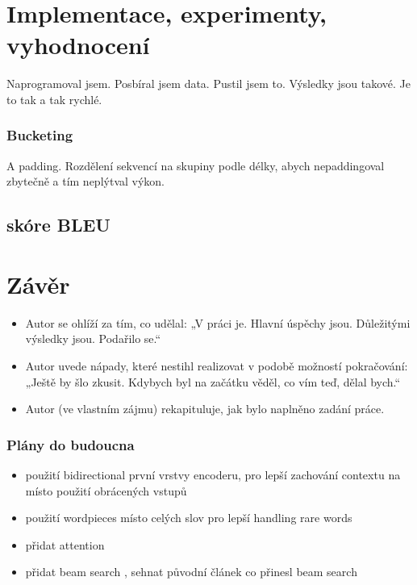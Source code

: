 \chapter{Implementace, experimenty, vyhodnocení}
Naprogramoval jsem.
Posbíral jsem data.
Pustil jsem to.
Výsledky jsou takové.
Je to tak a tak rychlé.

\subsection{Bucketing}
A padding. Rozdělení sekvencí na skupiny podle délky, abych nepaddingoval zbytečně a tím neplýtval výkon.

\section{skóre BLEU}

\chapter{Závěr}
\begin{itemize}
  \item Autor se ohlíží za tím, co udělal: „V práci je. Hlavní úspěchy jsou. Důležitými výsledky jsou. Podařilo se.“
  \item Autor uvede nápady, které nestihl realizovat v podobě možností pokračování: „Ještě by šlo zkusit. Kdybych byl na začátku věděl, co vím teď, dělal bych.“
  \item Autor (ve vlastním zájmu) rekapituluje, jak bylo naplněno zadání práce.
\end{itemize}

\subsection{Plány do budoucna}
\begin{itemize}
    \item použití bidirectional první vrstvy encoderu, pro lepší zachování contextu \cite{googleBridgingGap} na místo použití obrácených vstupů
    \item použití wordpieces \cite{googleBridgingGap} místo celých slov pro lepší handling rare words
    \item přidat attention \cite{attention}
    \item přidat beam search \cite{nmtTutorial}, sehnat původní článek co přinesl beam search
\end{itemize}
